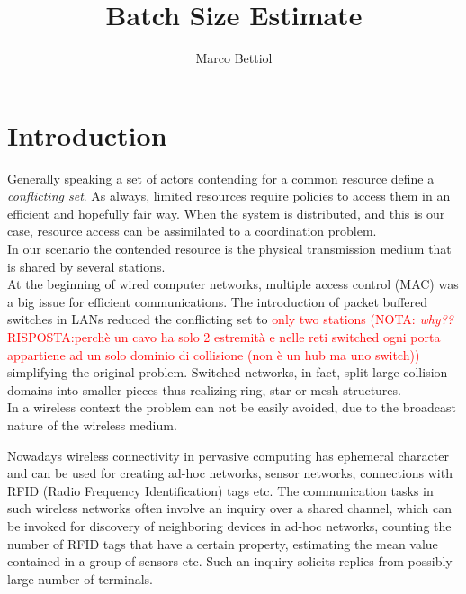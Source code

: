 \documentclass[12pt,a4paper]{report}
\title{Batch Size Estimate}
\author{Marco Bettiol}
\newcommand{\rev}[1]{\textcolor{Cerulean}{#1}}
\begin{document}

\tableofcontents
\listoffigures
\listoftables

\chapter{Introduction}

Generally speaking a set of actors contending for a common resource define a \emph{conflicting set}. As always, limited resources require policies to access them in an efficient and hopefully fair way. When the system is distributed, and this is our case, resource access can be assimilated to a coordination problem.\\ 
\rev{In our scenario the contended resource is the physical transmission medium that is shared by several stations.}\\ \rev{At the beginning of wired computer networks, multiple access control (MAC) was a big issue for efficient communications. The introduction of packet buffered switches  in LANs reduced the conflicting set to \textcolor{red}{only two stations (NOTA: \emph{why??} RISPOSTA:perchè un cavo ha solo 2 estremità e nelle reti switched ogni porta appartiene ad un solo dominio di collisione (non è un hub ma uno switch))}  simplifying  the original problem. Switched networks, in fact, split large collision domains into smaller pieces thus realizing ring, star or mesh structures.\\ 
In a wireless context the problem can not be easily avoided, due to the broadcast nature of the wireless medium.\\  
}

Nowadays wireless connectivity in pervasive computing has ephemeral character and can be used for creating ad-hoc networks, sensor networks, connections with RFID (Radio Frequency Identification) tags etc. The communication tasks in such wireless networks often involve an inquiry over a shared channel, which can be invoked for discovery of neighboring devices in ad-hoc networks, counting the number of RFID tags that have a certain property, estimating the mean value contained in a group of sensors etc. Such an inquiry solicits replies from possibly large number of terminals.\\
\end{document}
